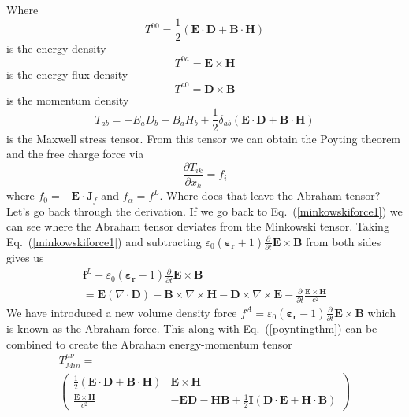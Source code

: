 \documentclass[twocolumn,english,pra,aps,superscriptaddress,floatfix]{revtex4-1}
\begin{document}
Where  
\begin{equation}
T^{00} = \frac{1}{2}\left(\mathbf{E}\cdot\mathbf{D} + \mathbf{B}\cdot\mathbf{H}\right)
\label{energydensity2}
\end{equation}
is the energy density
\begin{equation}
T^{0a} = \mathbf{E}\times\mathbf{H} 
\label{energyflux2}
\end{equation}
is the energy flux density 
\begin{equation}
T^{a0} = \mathbf{D}\times\mathbf{B} 
\label{momentumdensity2}
\end{equation}
is the momentum density
\begin{equation}
T_{ab}= -E_aD_b - B_aH_b+\frac{1}{2}\delta_{ab}\left(\mathbf{E}\cdot\mathbf{D}+ \mathbf{B}\cdot\mathbf{H}\right)
\label{stresstensor4}
\end{equation}
is the Maxwell stress tensor.  From this tensor we can obtain the Poyting theorem and the free charge force via
\begin{equation}
\frac{\partial T_{ik}}{\partial x_k}=f_i
\end{equation}
where $f_0=-\mathbf{E}\cdot\mathbf{J}_f$ and $f_{\alpha}=f^L$.  Where does that leave the Abraham tensor?  Let's go back through the derivation.  If we go back to Eq.\ (\ref{minkowskiforce1}) we can see where the Abraham tensor deviates from the Minkowski tensor.  Taking Eq.\ (\ref{minkowskiforce1}) and subtracting  
$\varepsilon_0\left(\mathbf{\varepsilon_r}+1\right)\frac{\partial}{\partial t}\mathbf{E}\times\mathbf{B}$ from both sides gives us
\begin{align}
&\mathbf{f}^L +\varepsilon_0\left(\mathbf{\varepsilon_r}-1\right)\frac{\partial}{\partial t}\mathbf{E}\times\mathbf{B}& \nonumber \\&=\mathbf{E}\left(\nabla\cdot\mathbf{D}\right) -\mathbf{B}\times\nabla\times\mathbf{H}-\mathbf{D}\times\nabla\times\mathbf{E}-\frac{\partial}{\partial t}\frac{\mathbf{E}\times\mathbf{H}}{c^2}&
\label{abrahamforce1}
\end{align}
We have introduced a new volume density force $f^A=\varepsilon_0\left(\mathbf{\varepsilon_r}-1\right)\frac{\partial}{\partial t}\mathbf{E}\times\mathbf{B}$ which is known as the Abraham force.  
This along with Eq.\ (\ref{poyntingthm}) can be combined to create the Abraham energy-momentum tensor
\begin{align}
&T^{\mu\nu}_{Min} =& \nonumber \\ &\begin{pmatrix} \frac{1}{2}\left(\mathbf{E}\cdot\mathbf{D} + \mathbf{B}\cdot\mathbf{H}\right) & \mathbf{E}\times\mathbf{H} \\  \frac{\mathbf{E}\times\mathbf{H}}{c^2} & -\mathbf{E}\mathbf{D}-\mathbf{H}\mathbf{B}+\frac{1}{2}\mathbf{I}\left(\mathbf{D}\cdot\mathbf{E}+\mathbf{H}\cdot\mathbf{B}\right) \end{pmatrix}&
\label{tensor}
\end{align}
\end{document}
